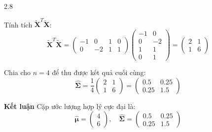 \begin{question}{2.8}
\begin{subquestion}
\begin{answer}
Tính tích $\tilde{\mathbf{X}}^T \tilde{\mathbf{X}}$:
$$ \tilde{\mathbf{X}}^T \tilde{\mathbf{X}} = \begin{pmatrix} -1 & 0 & 1 & 0 \\ 0 & -2 & 1 & 1 \end{pmatrix} \begin{pmatrix} -1 & 0 \\ 0 & -2 \\ 1 & 1 \\ 0 & 1 \end{pmatrix} = \begin{pmatrix} 2 & 1 \\ 1 & 6 \end{pmatrix} $$

Chia cho $n = 4$ để thu được kết quả cuối cùng:
$$ \hat{\boldsymbol{\Sigma}} = \frac{1}{4} \begin{pmatrix} 2 & 1 \\ 1 & 6 \end{pmatrix} = \begin{pmatrix} 0.5 & 0.25 \\ 0.25 & 1.5 \end{pmatrix} $$

\textbf{Kết luận}
Cặp ước lượng hợp lý cực đại là:
$$ \hat{\boldsymbol{\mu}} = \begin{pmatrix} 4 \\ 6 \end{pmatrix}, \quad \hat{\boldsymbol{\Sigma}} = \begin{pmatrix} 0.5 & 0.25 \\ 0.25 & 1.5 \end{pmatrix} $$

\end{answer}
\end{subquestion}
\end{question}